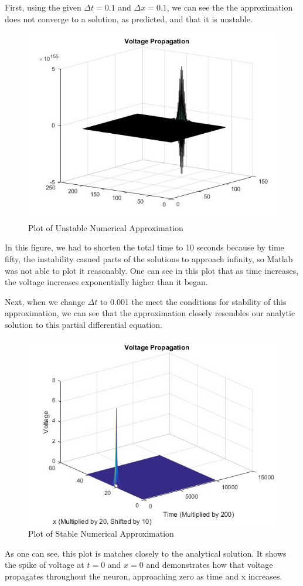\documentclass[12pt]{article}
\begin{document}
First, using the given $\Delta{t}=0.1$ and $\Delta{x}=0.1$, we can see the the approximation does not converge to a solution, as predicted, and that it is unstable. 
\begin{figure}[H]
  \includegraphics[width=\linewidth]{plot1.jpg}
  \caption{Plot of Unstable Numerical Approximation}
  \label{fig:sketch1}
\end{figure}
In this figure, we had to shorten the total time to 10 seconds because by time fifty, the instability casued parts of the solutions to approach infinity, so Matlab was not able to plot it reasonably. One can see in this plot that as time increases, the voltage increases exponentially higher than it began. \par
Next, when we change $\Delta{t}$ to 0.001 the meet the conditions for stability of this approximation, we can see that the approximation closely resembles our analytic solution to this partial differential equation.
\begin{figure}[H]
  \includegraphics[width=\linewidth]{Plot2.jpg}
  \caption{Plot of Stable Numerical Approximation}
  \label{fig:sketch2}
\end{figure}
As one can see, this plot is matches closely to the analytical solution. It shows the spike of voltage at $t=0$ and $x=0$ and demonstrates how that voltage propagates throughout the neuron, approaching zero as time and x increases. 
\end{document}
